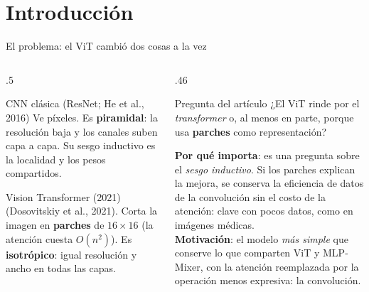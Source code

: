 \documentclass[aspectratio=169,xcolor=table]{beamer}
\begin{document}
\section{Introducción}
\begin{frame}{El problema: el ViT cambió dos cosas a la vez}
  \begin{columns}[T]
    \begin{column}{.5\textwidth}
      \begin{block}{CNN clásica (ResNet; He et al., 2016)}
        \small Ve píxeles. Es \textbf{piramidal}: la resolución baja y los canales suben capa a capa.
        Su sesgo inductivo es la localidad y los pesos compartidos.
      \end{block}
      \vspace{4pt}
      \begin{block}{Vision Transformer (2021)}
        \small (Dosovitskiy et al., 2021). Corta la imagen en \textbf{parches} de $16\times16$ (la atención cuesta
        $O(n^2)$). Es \textbf{isotrópico}: igual resolución y ancho en todas las capas.
      \end{block}
    \end{column}
    \begin{column}{.46\textwidth}
      \begin{alertblock}{Pregunta del artículo}
        \small ¿El ViT rinde por el \emph{transformer} o, al menos en parte, porque usa \textbf{parches} como
        representación?
      \end{alertblock}
      \vspace{4pt}
      {\footnotesize\textbf{Por qué importa}: es una pregunta sobre el \emph{sesgo inductivo}. Si los parches
      explican la mejora, se conserva la eficiencia de datos de la convolución sin el costo de la atención: clave
      con pocos datos, como en imágenes médicas.}\\[4pt]
      {\footnotesize\textbf{Motivación}: el modelo \emph{más simple} que conserve lo que comparten ViT y
      MLP-Mixer, con la atención reemplazada por la operación menos expresiva: la convolución.}
    \end{column}
  \end{columns}
\end{frame}

\end{document}
